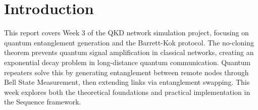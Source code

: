 \begin{abstract}
    \noindent
    This weekly report documents the progress made in Week 3 of the quantum key distribution (QKD) network simulation project. The primary focus was understanding the theoretical foundations of quantum entanglement generation and management, specifically the Barrett-Kok protocol and entanglement swapping techniques. Key topics included analyzing the fundamental challenges of long-distance quantum communication, understanding the quantum mechanical principles underlying entanglement distribution, and implementing a practical simulation using the Sequence framework that demonstrates entanglement generation between remote nodes through a central Bell State Measurement station. These concepts are essential for building scalable quantum repeater networks and implementing secure quantum key distribution protocols across extended distances.
\end{abstract}
\newpage

\renewcommand{\baselinestretch}{1}\normalsize
\tableofcontents
\renewcommand{\baselinestretch}{1}\normalsize
\thispagestyle{fancy}
\newpage

\doublespacing
\thispagestyle{fancy}



\section{Introduction}

This report covers Week 3 of the QKD network simulation project, focusing on quantum entanglement generation and the Barrett-Kok protocol. The no-cloning theorem prevents quantum signal amplification in classical networks, creating an exponential decay problem in long-distance quantum communication. Quantum repeaters solve this by generating entanglement between remote nodes through Bell State Measurement, then extending links via entanglement swapping. This week explores both the theoretical foundations and practical implementation in the Sequence framework.

